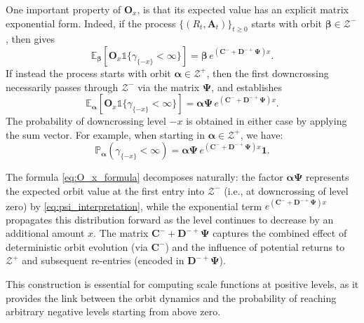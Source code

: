 \documentclass[a4paper,11pt]{article}
\numberwithin{equation}{section}
\theoremstyle{plain}
\theoremstyle{definition}
\newcommand{\1}{\mathbf{1}}
\begin{document}
One important property of $\bm{O}_x$, is that its expected value has an explicit matrix exponential form. Indeed, if the process $\{(R_t, \bm{A}_t)\}_{t \ge 0}$ starts with orbit $\bm{\beta} \in \mathcal{Z}^-$, then \cite[Theorem 4.4]{BeanNguyenNielsenPeralta2022} gives
\begin{equation}\label{eq:O_x_formula_minus}
\mathbb{E}_{\bm{\beta}}[\bm{O}_x \mathds{1}\{\gamma_{\{-x\}} < \infty\}] = \bm{\beta} \, e^{(\bm{C}^- + \bm{D}^{-+}\bm{\Psi})x}.
\end{equation}
If instead the process starts with orbit $\bm{\alpha} \in \mathcal{Z}^+$, then the first downcrossing necessarily passes through $\mathcal{Z}^-$ via the matrix $\bm{\Psi}$, and \cite[Corollary 4.5]{BeanNguyenNielsenPeralta2022} establishes
\begin{equation}\label{eq:O_x_formula}
\mathbb{E}_{\bm{\alpha}}[\bm{O}_x \mathds{1}\{\gamma_{\{-x\}} < \infty\}] = \bm{\alpha} \bm{\Psi} \, e^{(\bm{C}^- + \bm{D}^{-+}\bm{\Psi})x}.
\end{equation}
The probability of downcrossing level $-x$ is obtained in either case by applying the sum vector. For example, when starting in $\bm{\alpha} \in \mathcal{Z}^+$, we have:
\begin{equation}\label{eq:downcrossing_prob}
\mathbb{P}_{\bm{\alpha}}(\gamma_{\{-x\}} < \infty) = \bm{\alpha} \bm{\Psi} \, e^{(\bm{C}^- + \bm{D}^{-+}\bm{\Psi})x} \bm{1}.
\end{equation}

The formula \eqref{eq:O_x_formula} decomposes naturally: the factor $\bm{\alpha} \bm{\Psi}$ represents the expected orbit value at the first entry into $\mathcal{Z}^-$ (i.e., at downcrossing of level zero) by \eqref{eq:psi_interpretation}, while the exponential term $e^{(\bm{C}^- + \bm{D}^{-+}\bm{\Psi})x}$ propagates this distribution forward as the level continues to decrease by an additional amount $x$. The matrix $\bm{C}^- + \bm{D}^{-+}\bm{\Psi}$ captures the combined effect of deterministic orbit evolution (via $\bm{C}^-$) and the influence of potential returns to $\mathcal{Z}^+$ and subsequent re-entries (encoded in $\bm{D}^{-+}\bm{\Psi}$).

This construction is essential for computing scale functions at positive levels, as it provides the link between the orbit dynamics and the probability of reaching arbitrary negative levels starting from above zero.
\end{document}
